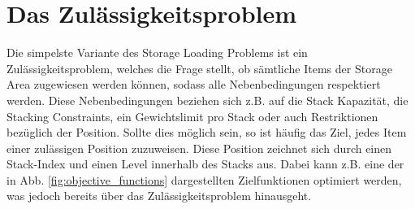 \pagebreak

\section{Das Zulässigkeitsproblem}
\label{sec:decision_problem}

Die simpelste Variante des Storage Loading Problems ist ein Zulässigkeitsproblem, welches die Frage stellt, ob sämtliche Items der Storage Area zugewiesen werden können, sodass alle Nebenbedingungen respektiert werden.
Diese Nebenbedingungen beziehen sich z.B. auf die Stack Kapazität, die Stacking Constraints, ein Gewichtslimit pro Stack oder auch
Restriktionen bezüglich der Position.\newline
Sollte dies möglich sein, so ist häufig das Ziel, jedes Item einer zulässigen Position zuzuweisen.
Diese Position zeichnet sich durch einen Stack-Index und einen Level innerhalb des Stacks aus.
Dabei kann z.B. eine der in Abb. \ref{fig:objective_functions} dargestellten Zielfunktionen optimiert werden, was jedoch bereits über
das Zulässigkeitsproblem hinausgeht.

\pagebreak

